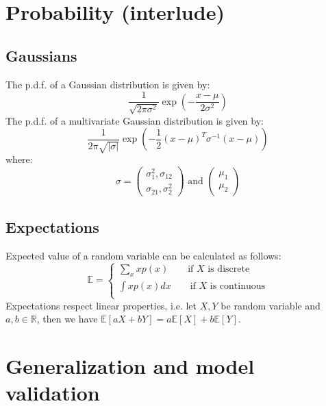 \documentclass[a4paper,10pt,twoside]{article}
\begin{document}
\section{Probability (interlude)}
\subsection{Gaussians}

The p.d.f. of a Gaussian distribution is given by:
\begin{equation}
    \frac{1}{\sqrt{2\pi\sigma^2}}\exp\left(-\frac{x-\mu}{2\sigma^2}\right)
\end{equation}
The p.d.f. of a multivariate Gaussian distribution is given by:
\begin{equation}
    \frac{1}{2\pi\sqrt{|\sigma|}}\exp\left(-\frac{1}{2}(x-\mu)^T\sigma^{-1}(x-\mu)\right)
\end{equation}
where:
\begin{equation}
    \sigma = \begin{pmatrix}
        \sigma_{1}^2, \sigma_{12}\\
        \sigma_{21}, \sigma_{2}^2
    \end{pmatrix}
    \text{ and }
    \begin{pmatrix}
        \mu_1\\
        \mu_2
    \end{pmatrix}
\end{equation}
\subsection{Expectations}
Expected value of a random variable can be calculated as follows:
\begin{equation*}
    \mathbb{E}=\begin{cases}
        \sum_{x}xp(x)\qquad\text{if }X\text{ is discrete}\\
        \int xp(x)dx\qquad\text{if }X\text{ is continuous}\\
    \end{cases}
\end{equation*}
Expectations respect linear properties, i.e. let $X, Y$ be random variable and
$a,b\in\mathbb{R}$, then we have $\mathbb{E}[aX+bY]=a\mathbb{E}[X]+b\mathbb{E}[Y]$.

\section{Generalization and model validation}
\end{document}
